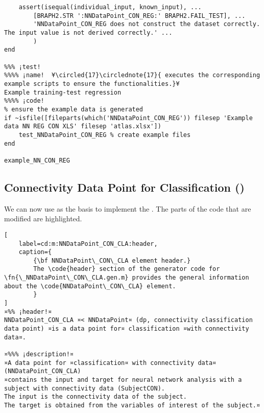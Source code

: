 \documentclass{tufte-handout}
\begin{document}
\begin{lstlisting}
    assert(isequal(individual_input, known_input), ...
        [BRAPH2.STR ':NNDataPoint_CON_REG:' BRAPH2.FAIL_TEST], ...
        'NNDataPoint_CON_REG does not construct the dataset correctly. The input value is not derived correctly.' ...
        )
end

%%% ¡test! 
%%%% ¡name!  ¥\circled{17}\circlednote{17}{ executes the corresponding example scripts to ensure the functionalities.}¥
Example training-test regression
%%%% ¡code!
% ensure the example data is generated
if ~isfile([fileparts(which('NNDataPoint_CON_REG')) filesep 'Example data NN REG CON XLS' filesep 'atlas.xlsx'])
    test_NNDataPoint_CON_REG % create example files
end

example_NN_CON_REG

\end{lstlisting}

\clearpage
\subsection{Connectivity Data Point for Classification ()}

We can now use  as the basis to implement the .
The parts of the code that are modified are highlighted. 

\begin{lstlisting}[
	label=cd:m:NNDataPoint_CON_CLA:header,
	caption={
		{\bf NNDataPoint\_CON\_CLA element header.}
		The \code{header} section of the generator code for \fn{\_NNDataPoint\_CON\_CLA.gen.m} provides the general information about the \code{NNDataPoint\_CON\_CLA} element.
		}
]
¤%% ¡header!¤
NNDataPoint_CON_CLA ¤< NNDataPoint¤ (dp, connectivity classification data point) ¤is a data point for¤ classification ¤with connectivity data¤.

¤%%% ¡description!¤
¤A data point for ¤classification¤ with connectivity data¤ (NNDataPoint_CON_CLA) 
¤contains the input and target for neural network analysis with a subject with connectivity data (SubjectCON).
The input is the connectivity data of the subject.
The target is obtained from the variables of interest of the subject.¤
\end{lstlisting}
\end{document}
